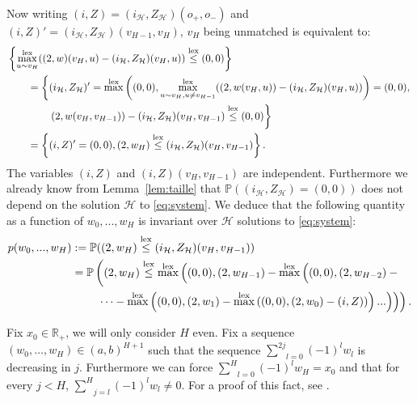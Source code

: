 \documentclass[11pt]{article}
\DeclareMathOperator{\lex}{lex}
\DeclareMathOperator*{\maxlex}{\overset{\lex}{\max}}
\begin{document}
    Now writing $(i,Z)=(i_{\mathcal{H}},Z_{\mathcal{H}})(o_+,o_-)$ and $(i,Z)'=(i_{\mathcal{H}},Z_{\mathcal{H}})(v_{H-1},v_H)$, $v_H$ being unmatched is equivalent to:
    \begin{align*}
        &\left\{ \maxlex_{u \sim v_H}((2,w)(v_H,u)-(i_{\mathcal{H}},Z_{\mathcal{H}})(v_H,u)) \overset{\lex}{\leq} (0,0)         \right\} \\
        & \qquad =\left\{ (i_{\mathcal{H}},Z_{\mathcal{H}})'=\maxlex\left( (0,0),\maxlex_{u \sim v_H, u \neq v_{H-1}}((2,w(v_H,u))-(i_{\mathcal{H}},Z_{\mathcal{H}})(v_H,u))\right)=(0,0) , \right. \\
        & \qquad \qquad \left.  (2,w(v_H,v_{H-1}))-(i_{\mathcal{H}},Z_{\mathcal{H}})(v_H,v_{H-1}) \overset{\lex}{\leq} (0,0)  \vphantom{\maxlex(0,\max_{u \sim v_H, u \neq v_{H-1}}} \right\} \\
        & \qquad =\left\{ (i,Z)'=(0,0), (2,w_H) \overset{\lex}{\leq} (i_{\mathcal{H}},Z_{\mathcal{H}})(v_H,v_{H-1})   \right\}.
    \end{align*}
    The variables $(i,Z)$ and $(i,Z)(v_{H},v_{H-1})$ are independent. Furthermore we already know from Lemma~\ref{lem:taille} that $\mathbb{P}((i_{\mathcal{H}},Z_{\mathcal{H}})=(0,0))$ does not depend on the solution ${\mathcal{H}}$ to \eqref{eq:system}. We deduce that the following quantity as a function of $w_0,...,w_H$ is invariant over ${\mathcal{H}}$ solutions to \eqref{eq:system}:
    \begin{align*}
        p(w_0,...,w_H) &:=\mathbb{P}((2,w_H) \overset{\lex}{\leq} (i_{\mathcal{H}},Z_{\mathcal{H}})(v_H,v_{H-1})) \\
        &=\mathbb{P}\left( (2,w_H) \overset{\lex}{\leq} \maxlex\left((0,0),(2,w_{H-1})-\maxlex\left((0,0),(2,w_{H-2})- \vphantom{\maxlex} \right. \right. \right.\\
        &\left.\left.\left. \qquad \cdots -\maxlex\left((0,0),(2,w_1)-\maxlex\left((0,0),(2,w_0)-(i,Z)\right) \right)... \right)  \right)    \right).
    \end{align*}

Fix $x_0 \in \mathbb{R}_+$, we will only consider $H$ even.
Fix a sequence $(w_0,\ldots,w_H) \in (a,b)^{H+1}$ such that the sequence $\underset{l=0}{\overset{2j}{\sum}}(-1)^l w_l$ is decreasing in $j$.
Furthermore we can force $\underset{l=0}{\overset{H}{\sum}}(-1)^l w_{H}=x_0$ and that for every $j<H$, $\underset{j=l}{\overset{H}{\sum}}(-1)^l w_l \neq 0$. For a proof of this fact, see \cite[Lemma 5.1.]{enriquez2024optimalunimodularmatching}.
\end{document}
